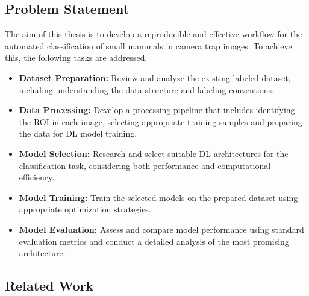 \subsection{Problem Statement}

The aim of this thesis is to develop a reproducible and effective workflow for the automated classification of small mammals in camera trap images. To achieve this, the following tasks are addressed:

\begin{itemize}
    \item \textbf{Dataset Preparation:} Review and analyze the existing labeled dataset, including understanding the data structure and labeling conventions.
    
    \item \textbf{Data Processing:} Develop a processing pipeline that includes identifying the \ac{ROI} in each image, selecting appropriate training samples and preparing the data for \ac{DL} model training.
    
    \item \textbf{Model Selection:} Research and select suitable \ac{DL} architectures for the classification task, considering both performance and computational efficiency.
    
    \item \textbf{Model Training:} Train the selected models on the prepared dataset using appropriate optimization strategies.
    
    \item \textbf{Model Evaluation:} Assess and compare model performance using standard evaluation metrics and conduct a detailed analysis of the most promising architecture.
\end{itemize}

\subsection{Related Work}

